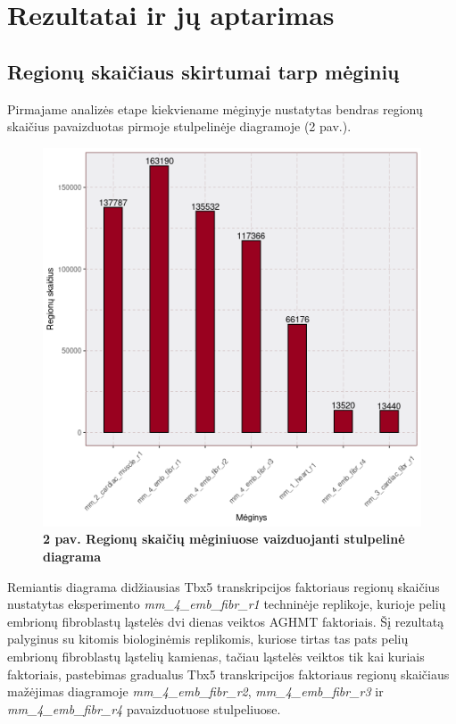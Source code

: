 \documentclass[12pt]{article}
\begin{document}
\newpage



\section{Rezultatai ir jų aptarimas}
\subsection{Regionų skaičiaus skirtumai tarp mėginių}
Pirmajame analizės etape kiekviename mėginyje nustatytas bendras regionų
skaičius pavaizduotas pirmoje stulpelinėje diagramoje (2 pav.).

\begin{figure}[htb]
    \begin{center}
        \includegraphics[width=0.6\linewidth]{../Figures/total_peak_counts.png}
        \caption*{\small\textbf{2 pav. Regionų skaičių mėginiuose vaizduojanti
                                stulpelinė diagrama}}
    \end{center}
\end{figure}

Remiantis diagrama didžiausias Tbx5 transkripcijos faktoriaus regionų skaičius
nustatytas eksperimento \small\emph{mm\_4\_emb\_fibr\_r1} techninėje replikoje,
kurioje pelių embrionų fibroblastų ląstelės dvi dienas veiktos AGHMT
faktoriais. Šį rezultatą palyginus su kitomis biologinėmis replikomis, kuriose
tirtas tas pats pelių embrionų fibroblastų ląstelių kamienas, tačiau ląstelės
veiktos tik kai kuriais faktoriais, pastebimas gradualus Tbx5 transkripcijos
faktoriaus regionų skaičiaus mažėjimas diagramoje
\small\emph{mm\_4\_emb\_fibr\_r2}, \small\emph{mm\_4\_emb\_fibr\_r3} ir
\small\emph{mm\_4\_emb\_fibr\_r4} pavaizduotuose stulpeliuose.
\end{document}
